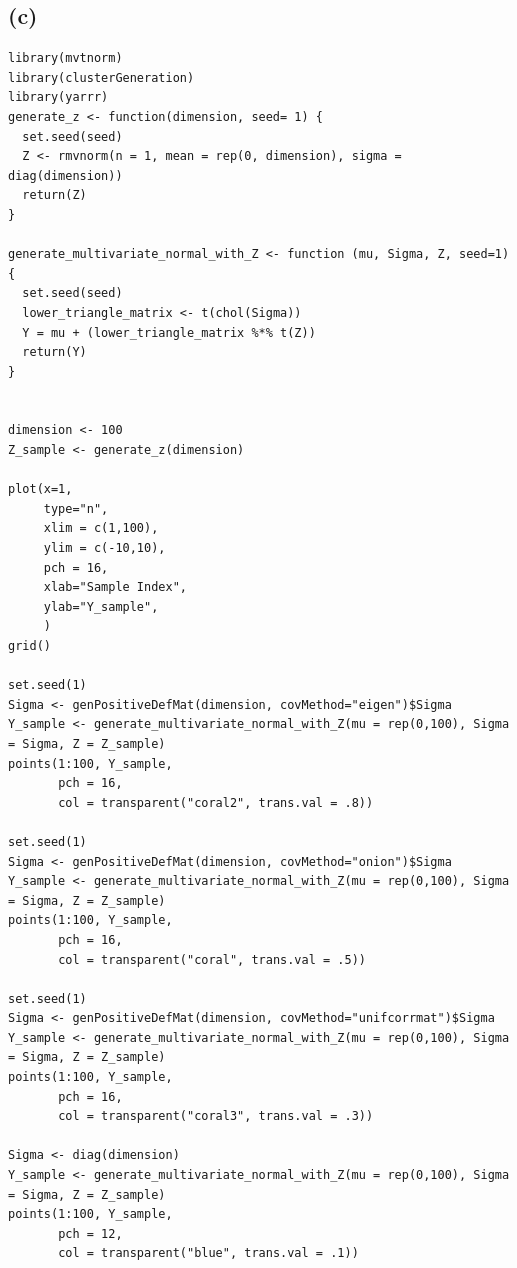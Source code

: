 \documentclass[11pt]{article}
\begin{document}
\subsection*{(c)}
 \begin{lstlisting}
library(mvtnorm)
library(clusterGeneration)
library(yarrr)
generate_z <- function(dimension, seed= 1) {
  set.seed(seed)
  Z <- rmvnorm(n = 1, mean = rep(0, dimension), sigma = diag(dimension))
  return(Z)
}

generate_multivariate_normal_with_Z <- function (mu, Sigma, Z, seed=1) {
  set.seed(seed)
  lower_triangle_matrix <- t(chol(Sigma))
  Y = mu + (lower_triangle_matrix %*% t(Z))
  return(Y)
}


dimension <- 100
Z_sample <- generate_z(dimension)

plot(x=1,
     type="n",
     xlim = c(1,100),
     ylim = c(-10,10),
     pch = 16,
     xlab="Sample Index",
     ylab="Y_sample",
     )
grid()

set.seed(1)
Sigma <- genPositiveDefMat(dimension, covMethod="eigen")$Sigma
Y_sample <- generate_multivariate_normal_with_Z(mu = rep(0,100), Sigma = Sigma, Z = Z_sample)
points(1:100, Y_sample,
       pch = 16,
       col = transparent("coral2", trans.val = .8))

set.seed(1)
Sigma <- genPositiveDefMat(dimension, covMethod="onion")$Sigma
Y_sample <- generate_multivariate_normal_with_Z(mu = rep(0,100), Sigma = Sigma, Z = Z_sample)
points(1:100, Y_sample,
       pch = 16,
       col = transparent("coral", trans.val = .5))

set.seed(1)
Sigma <- genPositiveDefMat(dimension, covMethod="unifcorrmat")$Sigma
Y_sample <- generate_multivariate_normal_with_Z(mu = rep(0,100), Sigma = Sigma, Z = Z_sample)
points(1:100, Y_sample,
       pch = 16,
       col = transparent("coral3", trans.val = .3))

Sigma <- diag(dimension)
Y_sample <- generate_multivariate_normal_with_Z(mu = rep(0,100), Sigma = Sigma, Z = Z_sample)
points(1:100, Y_sample,
       pch = 12,
       col = transparent("blue", trans.val = .1))
\end{lstlisting}
\end{document}
